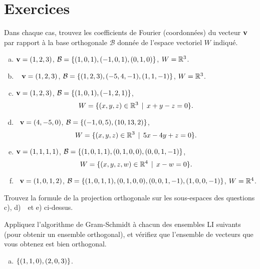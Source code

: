 \section*{Exercices}
 

\begin{prob} \label{prob19.1} Dans chaque cas, trouvez les coefficients de Fourier (coordonn\'ees) du vecteur $\mathbf{v}$ par rapport à la base orthogonale $\mathcal B$ donnée de l'espace vectoriel $W$ indiqué.
\medskip

\begin{enumerate}[a)]
\item  $\mathbf{v}=(1,2,3)$, $\mathcal B = \{(1,0,1),(-1,0,1), (0,1,0) \}$, $W=\mathbb{R}^3$.
\medskip
 
\item\sov~ $\mathbf{v}=(1,2,3)$, $\mathcal B = \{(1, 2 , 3 ),(-5, 4, -1),(1, 1, -1)\}$, $W=\mathbb{R}^3$.
\medskip
 
\item  $\mathbf{v}=(1,2,3)$, $\mathcal B = \{(1, 0, 1),(-1, 2, 1)\}$, $$W=\{(x,y,z)\in\mathbb{R}^3 \, \mid \, x+y-z=0\}.$$
 
 
\item\sov~$\mathbf{v}=(4,-5,0)$, $\mathcal B = \{(-1, 0, 5),(10, 13, 2)\}$, $$W=\{(x,y,z)\in\mathbb{R}^3 \, \mid \, 5x-4y+z=0\}.$$
 
 
\item $\mathbf{v}=(1,1,1,1)$,  $\mathcal B =\{(1, 0, 1, 1), (0, 1, 0, 0), (0, 0, 1, -1)\}$, $$W=\{(x,y,z, w)\in\mathbb{R}^4 \, \mid \, x-w=0\}.$$
\medskip
 
\item\sov~$\mathbf{v}=(1,0,1,2)$,  $\mathcal B =\{(1, 0, 1, 1), (0, 1, 0, 0), (0, 0, 1, -1),(1, 0, 0, -1)\}$, $W= \mathbb{R}^4$.
\medskip
 
\end{enumerate}

\end{prob} \begin{prob} \label{prob19.2} Trouvez la formule de la projection orthogonale sur les sous-espaces des questions c), d)~\sov~et e) ci-dessus.

\end{prob} \begin{prob} \label{prob19.3} Appliquez l'algorithme de Gram-Schmidt à chacun des ensembles LI suivants (pour obtenir un ensemble orthogonal), et vérifiez que l'ensemble de vecteurs que vous obtenez est bien orthogonal.
\medskip
\begin{enumerate}[a)]
\item $\{(1,1,0),(2,0,3)\}$.
\medskip
 

\end{enumerate}
\end{prob}
